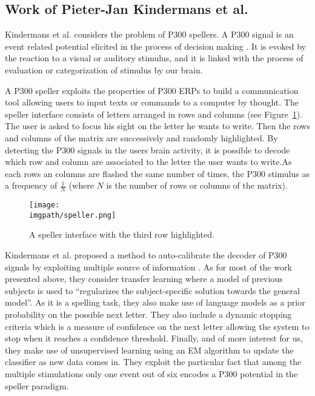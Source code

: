\subsection{Work of Pieter-Jan Kindermans et al.}
\label{chapter:related:bci:kindermans}

Kindermans et al. considers the problem of P300 spellers. A P300 signal is an event related potential elicited in the process of decision making \cite{polich2003theoretical}. It is evoked by the reaction to a visual or auditory stimulus, and it is linked with the process of evaluation or categorization of stimulus by our brain. 

A P300 speller exploits the properties of P300 ERPs to build a communication tool allowing users to input texts or commands to a computer by thought. The speller interface consists of letters arranged in rows and columns (see Figure~\ref{fig:speller}). The user is asked to focus his sight on the letter he wants to write. Then the rows and columns of the matrix are successively and randomly highlighted. By detecting the P300 signals in the users brain activity, it is possible to decode which row and column are associated to the letter the user wants to write.As each rows an columns are flashed the same number of times, the P300 stimulus as a frequency of $\frac{1}{N}$ (where $N$ is the number of rows or columns of the matrix).

\begin{figure}[!htbp]
  \centering
  \texttt{[image: \\imgpath/speller.png]}
  \caption{A speller interface with the third row highlighted.}
  \label{fig:speller}
\end{figure}

Kindermans et al. proposed a method to auto-calibrate the decoder of P300 signals by exploiting multiple source of information \cite{kindermans2012b,kindermans2014integrating}. As for most of the work presented above, they consider transfer learning where a model of previous subjects is used to ``regularizes the subject-specific solution towards the general model''. As it is a spelling task, they also make use of language models as a prior probability on the possible next letter. They also include a dynamic stopping criteria which is a measure of confidence on the next letter allowing the system to stop when it reaches a confidence threshold. Finally, and of more interest for us, they make use of unsupervised learning using an EM algorithm to update the classifier as new data comes in. They exploit the particular fact that among the multiple stimulations only one event out of six encodes a P300 potential in the speller paradigm.

